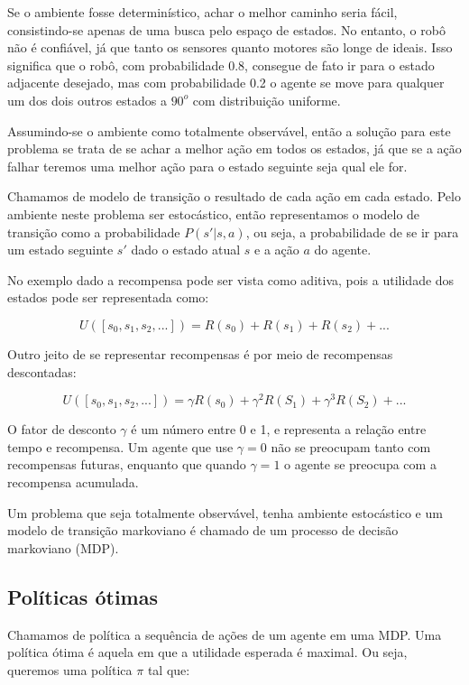 \documentclass[a4paper,10pt]{article}
\theoremstyle{plain}
\begin{document}
Se o ambiente fosse determinístico, achar o melhor caminho seria fácil, consistindo-se apenas de
uma busca pelo espaço de estados. No entanto, o robô não é confiável, já que tanto os sensores
quanto motores são longe de ideais. Isso significa que o robô, com probabilidade 0.8, consegue de
fato ir para o estado adjacente desejado, mas com probabilidade 0.2 o agente se move para qualquer
um dos dois outros estados a $90^o$ com distribuição uniforme.

Assumindo-se o ambiente como totalmente observável, então a solução para este problema se trata de
se achar a melhor ação em todos os estados, já que se a ação falhar teremos uma melhor ação para o
estado seguinte seja qual ele for.

Chamamos de modelo de transição o resultado de cada ação em cada estado. Pelo ambiente neste
problema ser estocástico, então representamos o modelo de transição como a probabilidade
$P(s'|s,a)$, ou seja, a probabilidade de se ir para um estado seguinte $s'$ dado o estado atual $s$
e a ação $a$ do agente.

No exemplo dado a recompensa pode ser vista como aditiva, pois a utilidade dos estados pode ser
representada como:

\begin{equation*}
  U([s_0,s_1,s_2,...]) = R(s_0) + R(s_1) + R(s_2) + ...
\end{equation*}

Outro jeito de se representar recompensas é por meio de recompensas descontadas:

\begin{equation*}
  U([s_0,s_1,s_2,...]) = \gamma R(s_0) + \gamma^2 R(S_1) + \gamma^3 R(S_2) + ...
\end{equation*}

O fator de desconto $\gamma$ é um número entre 0 e 1, e representa a relação entre tempo e
recompensa. Um agente que use $\gamma = 0$ não se preocupam tanto com recompensas futuras, enquanto
que quando $\gamma = 1$ o agente se preocupa com a recompensa acumulada.

Um problema que seja totalmente observável, tenha ambiente estocástico e um modelo de transição
markoviano é chamado de um processo de decisão markoviano (MDP).

\subsection{Políticas ótimas}

Chamamos de política a sequência de ações de um agente em uma MDP. Uma política ótima é aquela em
que a utilidade esperada é maximal. Ou seja, queremos uma política $\pi$ tal que:
\end{document}
